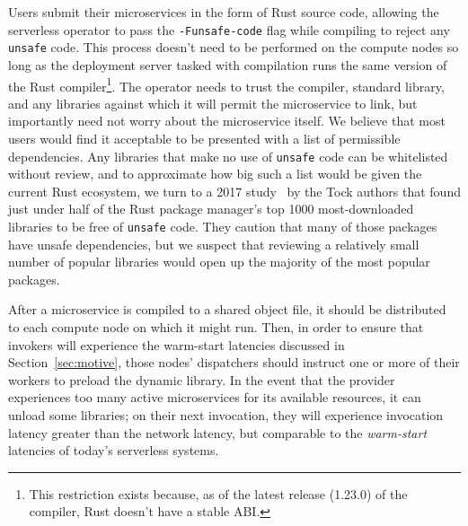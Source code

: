 
Users submit their microservices in the form of Rust source code, allowing the
serverless operator to pass the \texttt{-Funsafe-code} flag while compiling to reject
any \texttt{unsafe} code.  This process doesn't need to be performed on the compute
nodes so long as the deployment server tasked with compilation runs the same version
of the Rust compiler\footnote{This restriction exists because, as of the latest
release (1.23.0) of the compiler, Rust doesn't have a stable ABI.}.  The operator
needs to trust the compiler, standard library, and any libraries against which it
will permit the microservice to link, but importantly need not worry about the
microservice itself.  We believe that most users would find it acceptable to be
presented with a list of permissible dependencies.  Any libraries that make no use of
\texttt{unsafe} code can be whitelisted without review, and to approximate how big
such a list would be given the current Rust ecosystem, we turn to a 2017
study~\cite{www-cratesio-unsafe} by the Tock authors that found just under half of
the Rust package manager's top 1000 most-downloaded libraries to be free of
\texttt{unsafe} code.  They caution that many of those packages have unsafe
dependencies, but we suspect that reviewing a relatively small number of popular
libraries would open up the majority of the most popular packages.

After a microservice is compiled to a shared object file, it should be distributed to
each compute node on which it might run.  Then, in order to ensure that invokers will
experience the warm-start latencies discussed in Section~\ref{sec:motive}, those
nodes' dispatchers should instruct one or more of their workers to preload the
dynamic library.  In the event that the provider experiences too many active
microservices for its available resources, it can unload some libraries; on their
next invocation, they will experience invocation latency greater than the network
latency, but comparable to the \textit{warm-start} latencies of today's serverless
systems.
